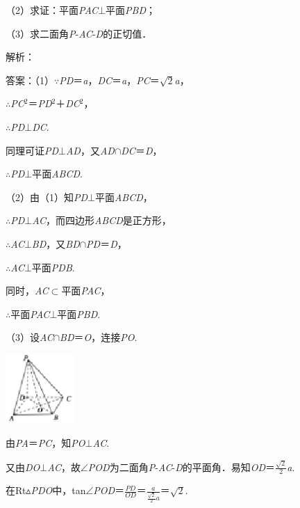 \documentclass{article} %
\begin{document}
（2）求证：平面\textit{PAC}$\mathrm{\bot}$平面\textit{PBD}；

（3）求二面角\textit{P}-\textit{AC}-\textit{D}的正切值．

解析：

答案：（1）$\mathrm{\because}$\textit{PD}＝\textit{a}，\textit{DC}＝\textit{a}，\textit{PC}＝$\sqrt{2}$\textit{a}，

$\mathrm{\therefore}$\textit{PC}${}^{2}$＝\textit{PD}${}^{2}$＋\textit{DC}${}^{2}$，

$\mathrm{\therefore}$\textit{PD}$\mathrm{\bot}$\textit{DC}.

同理可证\textit{PD}$\mathrm{\bot}$\textit{AD}，又\textit{AD}$\mathrm{\cap}$\textit{DC}＝\textit{D}，

$\mathrm{\therefore}$\textit{PD}$\mathrm{\bot}$平面\textit{ABCD}.

（2）由（1）知\textit{PD}$\mathrm{\bot}$平面\textit{ABCD}，

$\mathrm{\therefore}$\textit{PD}$\mathrm{\bot}$\textit{AC}，而四边形\textit{ABCD}是正方形，

$\mathrm{\therefore}$\textit{AC}$\mathrm{\bot}$\textit{BD}，又\textit{BD}$\mathrm{\cap}$\textit{PD}＝\textit{D}，

$\mathrm{\therefore}$\textit{AC}$\mathrm{\bot}$平面\textit{PDB}.

同时，\textit{AC}$\mathrm{\subset }$平面\textit{PAC}，

$\mathrm{\therefore}$平面\textit{PAC}$\mathrm{\bot}$平面\textit{PBD}.

（3）设\textit{AC}$\mathrm{\cap}$\textit{BD}＝\textit{O}，连接\textit{PO}.

\includegraphics*[width=1.04in, height=1.04in, keepaspectratio=false]{image218}

由\textit{PA}＝\textit{PC}，知\textit{PO}$\mathrm{\bot}$\textit{AC}.

又由\textit{DO}$\mathrm{\bot}$\textit{AC}，故$\mathrm{\angle}$\textit{POD}为二面角\textit{P}-\textit{AC}-\textit{D}的平面角．易知\textit{OD}＝$\frac{\sqrt{2}}{2}$\textit{a}.

在Rt$\mathrm{\vartriangle}$\textit{PDO}中，tan$\mathrm{\angle}$\textit{POD}＝$\frac{PD}{OD}$＝$\frac{a}{\frac{\sqrt{2}}{2}a}$＝$\sqrt{2}$.
\end{document}
